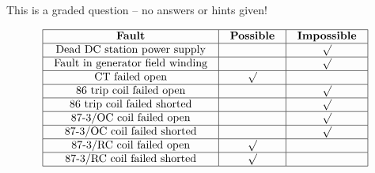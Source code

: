 \vfil 

\eject






This is a graded question -- no answers or hints given!








$$\vbox{\offinterlineskip
\halign{\strut
\vrule \quad\hfil # \ \hfil & 
\vrule \quad\hfil # \ \hfil & 
\vrule \quad\hfil # \ \hfil \vrule \cr
\noalign{\hrule}
%
{\bf Fault} & {\bf Possible} & {\bf Impossible} \cr
%
\noalign{\hrule}
%
Dead DC station power supply &  & $\surd$ \cr
%
\noalign{\hrule}
%
Fault in generator field winding &  & $\surd$ \cr
%
\noalign{\hrule}
%
CT failed open & $\surd$ &  \cr
%
\noalign{\hrule}
%
86 trip coil failed open &  & $\surd$ \cr
%
\noalign{\hrule}
%
86 trip coil failed shorted &  & $\surd$ \cr
%
\noalign{\hrule}
%
87-3/OC coil failed open &  & $\surd$ \cr
%
\noalign{\hrule}
%
87-3/OC coil failed shorted &  & $\surd$ \cr
%
\noalign{\hrule}
%
87-3/RC coil failed open & $\surd$ &  \cr
%
\noalign{\hrule}
%
87-3/RC coil failed shorted & $\surd$ &  \cr
%
\noalign{\hrule}
} %
}$$ %





